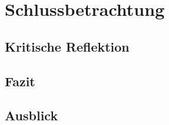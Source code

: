 \chapter{Schlussbetrachtung}\label{chapter:schlussbetrachtung}

\section{Kritische Reflektion}\label{chapter:kr}

\section{Fazit}\label{chapter:fazit}

\section{Ausblick}\label{chapter:fazit}